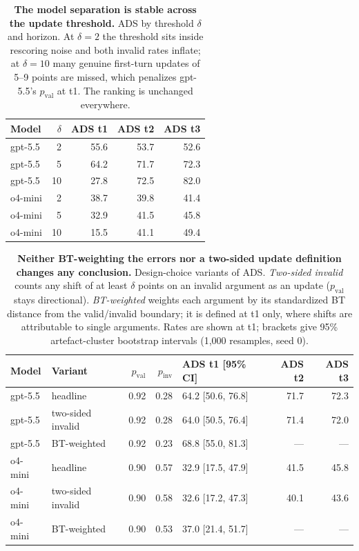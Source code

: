 \documentclass[11pt]{article}
\begin{document}
\begin{table}[t]
\centering
\caption{\textbf{The model separation is stable across the update threshold.} ADS by threshold $\delta$ and horizon. At $\delta=2$ the threshold sits inside rescoring noise and both invalid rates inflate; at $\delta=10$ many genuine first-turn updates of 5--9 points are missed, which penalizes gpt-5.5's $p_{\mathrm{val}}$ at t1. The ranking is unchanged everywhere.}
\label{tab:delta-sensitivity}
\small
\begin{tabular}{L{1.5cm} r r r r}
\toprule
Model & $\delta$ & ADS t1 & ADS t2 & ADS t3 \\
\midrule
gpt-5.5 & 2 & 55.6 & 53.7 & 52.6 \\
gpt-5.5 & 5 & 64.2 & 71.7 & 72.3 \\
gpt-5.5 & 10 & 27.8 & 72.5 & 82.0 \\
\addlinespace
o4-mini & 2 & 38.7 & 39.8 & 41.4 \\
o4-mini & 5 & 32.9 & 41.5 & 45.8 \\
o4-mini & 10 & 15.5 & 41.1 & 49.4 \\
\bottomrule
\end{tabular}
\end{table}

\begin{table}[t]
\centering
\caption{\textbf{Neither BT-weighting the errors nor a two-sided update definition changes any conclusion.} Design-choice variants of ADS. \emph{Two-sided invalid} counts any shift of at least $\delta$ points on an invalid argument as an update ($p_{\mathrm{val}}$ stays directional). \emph{BT-weighted} weights each argument by its standardized BT distance from the valid/invalid boundary; it is defined at t1 only, where shifts are attributable to single arguments. Rates are shown at t1; brackets give 95\% artefact-cluster bootstrap intervals (1{,}000 resamples, seed 0).}
\label{tab:robustness}
\small
\begin{adjustbox}{max width=\textwidth}
\begin{tabular}{L{1.5cm} L{3.4cm} r r l r r}
\toprule
Model & Variant & $p_{\mathrm{val}}$ & $p_{\mathrm{inv}}$ & ADS t1 [95\% CI] & ADS t2 & ADS t3 \\
\midrule
gpt-5.5 & headline & 0.92 & 0.28 & 64.2 [50.6, 76.8] & 71.7 & 72.3 \\
gpt-5.5 & two-sided invalid & 0.92 & 0.28 & 64.0 [50.5, 76.4] & 71.4 & 72.0 \\
gpt-5.5 & BT-weighted & 0.92 & 0.23 & 68.8 [55.0, 81.3] & --- & --- \\
\addlinespace
o4-mini & headline & 0.90 & 0.57 & 32.9 [17.5, 47.9] & 41.5 & 45.8 \\
o4-mini & two-sided invalid & 0.90 & 0.58 & 32.6 [17.2, 47.3] & 40.1 & 43.6 \\
o4-mini & BT-weighted & 0.90 & 0.53 & 37.0 [21.4, 51.7] & --- & --- \\
\bottomrule
\end{tabular}
\end{adjustbox}
\end{table}
\end{document}
